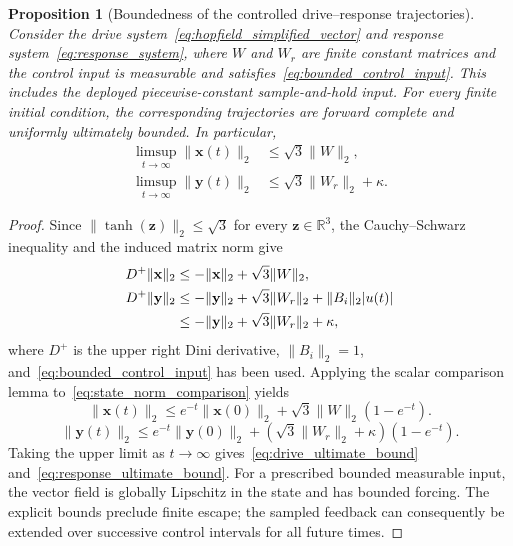 \documentclass[a4paper,fleqn]{cas-sc}
\theoremstyle{plain}
\newtheorem{proposition}{Proposition}[section]
\theoremstyle{definition}
\begin{document}
\begin{proposition}[Boundedness of the controlled drive--response trajectories]
\label{prop:closed_loop_boundedness}
Consider the drive system~\eqref{eq:hopfield_simplified_vector} and response system~\eqref{eq:response_system}, where $W$ and $W_r$ are finite constant matrices and the control input is measurable and satisfies~\eqref{eq:bounded_control_input}. This includes the deployed piecewise-constant sample-and-hold input. For every finite initial condition, the corresponding trajectories are forward complete and uniformly ultimately bounded. In particular,
\begin{align}
	\limsup_{t\to\infty}\|\mathbf{x}(t)\|_2
	&\leq \sqrt{3}\|W\|_2,
	\label{eq:drive_ultimate_bound}\\
	\limsup_{t\to\infty}\|\mathbf{y}(t)\|_2
	&\leq \sqrt{3}\|W_r\|_2+\kappa.
	\label{eq:response_ultimate_bound}
\end{align}
\end{proposition}

\begin{proof}
Since $\|\tanh(\mathbf{z})\|_2\leq\sqrt{3}$ for every $\mathbf{z}\in\mathbb{R}^3$, the Cauchy--Schwarz inequality and the induced matrix norm give
\begin{align}
	D^+\|\mathbf{x}\|_2
	&\leq-\|\mathbf{x}\|_2+\sqrt{3}\|W\|_2, \notag\\
	D^+\|\mathbf{y}\|_2
	&\leq-\|\mathbf{y}\|_2+\sqrt{3}\|W_r\|_2+\|B_i\|_2|u(t)| \notag\\
	&\leq-\|\mathbf{y}\|_2+\sqrt{3}\|W_r\|_2+\kappa,
	\label{eq:state_norm_comparison}
\end{align}
where $D^+$ is the upper right Dini derivative, $\|B_i\|_2=1$, and~\eqref{eq:bounded_control_input} has been used. Applying the scalar comparison lemma to~\eqref{eq:state_norm_comparison} yields
\begin{equation}
	\|\mathbf{x}(t)\|_2
	\leq e^{-t}\|\mathbf{x}(0)\|_2
	+\sqrt{3}\|W\|_2(1-e^{-t}).
	\label{eq:drive_explicit_bound}
\end{equation}
\begin{equation}
	\|\mathbf{y}(t)\|_2
	\leq e^{-t}\|\mathbf{y}(0)\|_2
	+\left(\sqrt{3}\|W_r\|_2+\kappa\right)(1-e^{-t}).
	\label{eq:response_explicit_bound}
\end{equation}
Taking the upper limit as $t\to\infty$ gives~\eqref{eq:drive_ultimate_bound} and~\eqref{eq:response_ultimate_bound}. For a prescribed bounded measurable input, the vector field is globally Lipschitz in the state and has bounded forcing. The explicit bounds preclude finite escape; the sampled feedback can consequently be extended over successive control intervals for all future times.
\end{proof}
\end{document}
